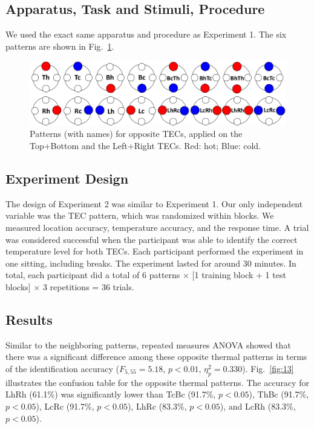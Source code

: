 \documentclass[preprint,12pt]{elsarticle}
\begin{document}
\subsection{Apparatus, Task and Stimuli, Procedure}
We used the exact same apparatus and procedure as Experiment 1. The six patterns are shown in Fig.~\ref{fig:12}.

\begin{figure}[tp]
  \centering
  \includegraphics[width=0.9\columnwidth]{img/fig12.pdf}
  \caption{Patterns (with names) for opposite TECs, applied on the Top+Bottom and the Left+Right TECs. Red: hot; Blue: cold.}
  \label{fig:12}
\end{figure}

\subsection{Experiment Design}
The design of Experiment 2 was similar to Experiment 1. Our only independent variable was the TEC pattern, which was randomized within blocks. We measured location accuracy, temperature accuracy, and the response time. A trial was considered successful when the participant was able to identify the correct temperature level for both TECs. Each participant performed the experiment in one sitting, including breaks. The experiment lasted for around 30 minutes. In total, each participant did a total of 6 patterns $\times$ [1 training block + 1 test blocks] $\times$ 3 repetitions = 36 trials.


\subsection{Results}
Similar to the neighboring patterns, repeated measures ANOVA showed that there was a significant difference among these opposite thermal patterns in terms of the identification accuracy ($F_{5, 55} = 5.18$, $p < 0.01$, $\eta_p^2 = 0.330$).
 Fig.~\ref{fig:13} illustrates the confusion table for the opposite thermal patterns.
 The accuracy for LhRh (61.1\%) was significantly lower than TcBc (91.7\%, $p < 0.05$), ThBc (91.7\%, $p < 0.05$), LcRc (91.7\%, $p < 0.05$), LhRc (83.3\%, $p < 0.05$), and LcRh (83.3\%, $p < 0.05$).
\end{document}
